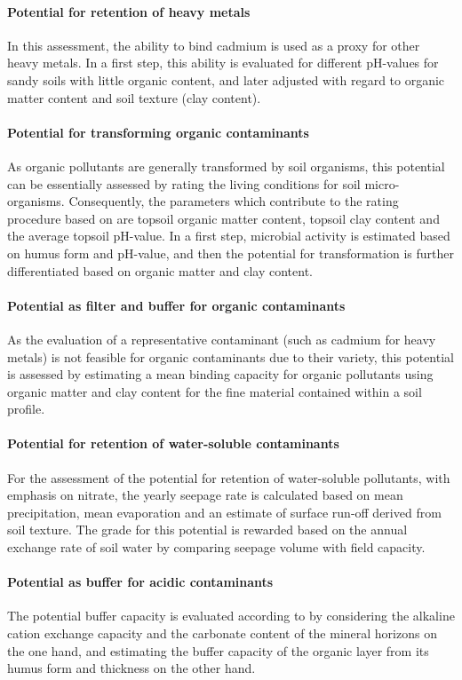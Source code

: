 \documentclass[preprint,12pt,authoryear]{elsarticle}
\begin{document}
\paragraph{Potential for retention of heavy metals}
In this assessment, the ability to bind cadmium is used as a proxy for other heavy metals. In a first step, this ability is evaluated for different pH-values for sandy soils with little organic content, and later adjusted with regard to organic matter content and soil texture (clay content).
\paragraph{Potential for transforming organic contaminants}
As organic pollutants are generally transformed by soil organisms, this potential can be essentially assessed by rating the living conditions for soil micro-organisms. Consequently, the parameters which contribute to the rating procedure based on \cite{LUBW1995}  are topsoil organic matter content, topsoil clay content and the average topsoil pH-value. In a first step, microbial activity is estimated based on humus form and pH-value, and then the potential for transformation is further differentiated based on organic matter and clay content.
\paragraph{Potential as  filter and buffer for organic contaminants}
As the evaluation of a representative contaminant (such as cadmium for heavy metals) is not feasible for organic contaminants due to their variety, this potential is assessed by estimating a mean binding capacity for organic pollutants using organic matter and clay content for the fine material contained within a soil profile.
\paragraph{Potential for retention of water-soluble contaminants}
For the assessment of the potential for retention of water-soluble pollutants, with emphasis on nitrate, the yearly seepage rate is calculated based on mean precipitation, mean evaporation and an estimate of surface run-off derived from soil texture. The grade for this potential is rewarded based on the annual exchange rate of soil water by comparing seepage volume with field capacity.
\paragraph{Potential as buffer for acidic contaminants}
The potential buffer capacity is evaluated according to \cite{BAYGLA2003} by considering the alkaline cation exchange capacity and the carbonate content of the mineral horizons on the one hand, and estimating the buffer capacity of the organic layer from its humus form and thickness on the other hand.
\end{document}
